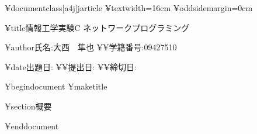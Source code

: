 ¥documentclass[a4j]{jarticle}
¥textwidth=16cm
¥oddsidemargin=0cm

¥title{情報工学実験C ネットワークプログラミング}

¥author{氏名:大西　隼也 ¥¥学籍番号:09427510}

¥date{出題日: ¥¥提出日: ¥¥締切日:}

¥begin{document}
¥maketitle

¥section{概要}

¥end{document}